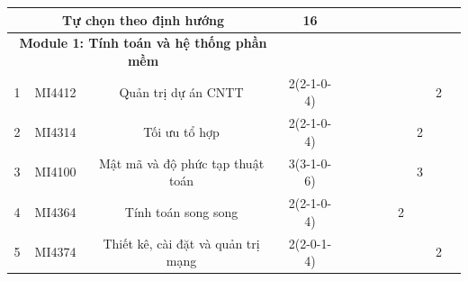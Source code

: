 \documentclass[12pt,a4paper]{report}
\begin{document}
\begin{landscape}
\begin{longtable}[c]{|c|c|c|c|c|c|c|c|c|c|c|c|}
        \multicolumn{3}{|c|}{\textbf{Tự chọn theo định hướng}}                                                                         & \textbf{16}                                                                          &             &             &             &             &             &             &             &             \\ \hline
        \multicolumn{3}{|c|}{\textbf{Module 1: Tính toán và hệ thống phần mềm}}                                                        &                                                                                      &             &             &             &             &             &             &             &             \\ \hline
        1                             & MI4412                          & Quản trị dự án CNTT                                          & 2(2-1-0-4)                                                                           &             &             &             &             &             &             & 2           &             \\ \hline
        2                             & MI4314                          & Tối ưu tổ hợp                                                & 2(2-1-0-4)                                                                           &             &             &             &             &             & 2           &             &             \\ \hline
        3                             & MI4100                          & Mật mã và độ phức tạp thuật toán                             & 3(3-1-0-6)                                                                           &             &             &             &             &             & 3           &             &             \\ \hline
        4                             & MI4364                          & Tính toán song song                                          & 2(2-1-0-4)                                                                           &             &             &             &             & 2           &             &             &             \\ \hline
        5                             & MI4374                          & Thiết kê, cài đặt và quản trị mạng                           & 2(2-0-1-4)                                                                           &             &             &             &             &             &             & 2           &             \\ \hline

\end{longtable}
\end{landscape}
\end{document}
